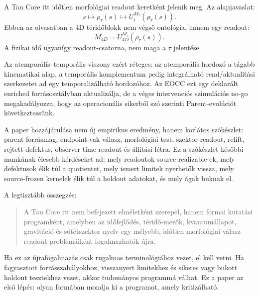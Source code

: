\documentclass[12pt]{article}
\newcommand{\Rmap}{\rho_{\tau}}
\newcommand{\Mta}{M_{\tau}}
\begin{document}
A Tau Core itt időtlen morfológiai readout keretként jelenik meg.  Az alapjavaslat:
\[
  s\mapsto\Rmap(s)\mapsto U_i^{\Mta}(\Rmap(s)).
\]
Ebben az olvasatban a 4D téridőblokk nem végső ontológia, hanem egy readout:
\[
  M_{4D}=U_{4D}^{\Mta}(\Rmap(s)).
\]
A fizikai idő ugyanígy readout-csatorna, nem maga a \(\tau\) jelentése.

Az atemporális--temporális viszony ezért réteges: az atemporális hordozó a
tágabb kinematikai alap, a temporális komplementum pedig integrálható
rend/aktualitási szerkezetet ad egy temporalizálható hordozóhoz. Az EOCC ezt
egy deklarált enriched forrásosztályban aktualizálja, de a véges intervenciós
szimulációs no-go megakadályozza, hogy az operacionális sikerből szó szerinti
Parent-evolúciót következtessünk.

A paper hozzájárulása nem új empirikus eredmény, hanem korlátos szókészlet:
parent forrásmag, endpoint-vak válasz, morfológiai test, szektor-readout,
relift, rejtett defektus, observer-time readout és állítási létra.  Ez a
szókészlet későbbi munkának élesebb kérdéseket ad: mely readoutok
source-realizable-ek, mely defektusok élik túl a quotientet, mely ismert
limitek nyerhetők vissza, mely source-frozen kernelek élik túl a holdout
adatokat, és mely ágak buknak el.

A legtisztább összegzés:
\begin{quote}
A Tau Core itt nem befejezett elméletként szerepel, hanem formai kutatási
programként, amelyben az időfejlődés, téridő-mezők, kvantumállapot, gravitáció
és sötétszektor-nyelv egy mélyebb, időtlen morfológiai válasz readout-problémáiként
fogalmazhatók újra.
\end{quote}

Ha ez az újrafogalmazás csak rugalmas terminológiához vezet, el kell vetni.  Ha
fagyasztott forrásszabályokhoz, visszanyert limitekhez és sikeres vagy bukott
holdout tesztekhez vezet, akkor tudományos programmá válhat.  Ez a paper az
első lépés: olyan formában mondja ki a programot, amely kritizálható.



\end{document}
